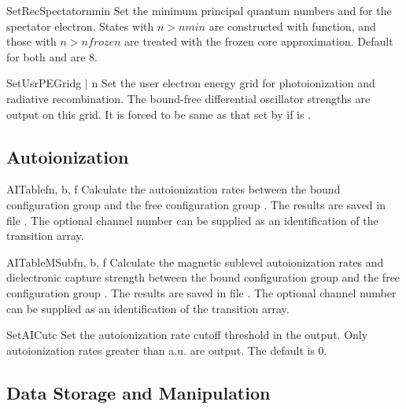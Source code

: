 \begin{fundesc}{SetRecSpectator}{nmin}
Set the minimum principal quantum numbers  and  for the
spectator electron. States with $n > nmin$ are constructed with
 function, and those with $n > nfrozen$ are treated with the
frozen core approximation. Default for both  and  are 8.
\end{fundesc}

\begin{fundesc}{SetUsrPEGrid}{g $\mid$ n}
Set the user electron energy grid for photoionization and radiative
recombination. The bound-free differential oscillator strengths are output on
this grid. It is forced to be same as that set by  if
 is .
\end{fundesc}


\subsection{Autoionization}

\begin{fundesc}{AITable}{fn, b, f}
Calculate the autoionization rates between the bound configuration group
 and the free configuration group . The results are saved in
file . The optional channel number  can be supplied as an
identification of the transition array.
\end{fundesc}

\begin{fundesc}{AITableMSub}{fn, b, f}
Calculate the magnetic sublevel autoionization rates and dielectronic capture
strength between the bound configuration group  and the free
configuration group . The results are saved in file . The
optional channel number  can be supplied as an identification of the
transition array.
\end{fundesc}

\begin{fundesc}{SetAICut}{c}
Set the autoionization rate cutoff threshold in the output. Only
autoionization rates greater than  a.u. are output. The default is 0.
\end{fundesc}


\subsection{Data Storage and Manipulation}

